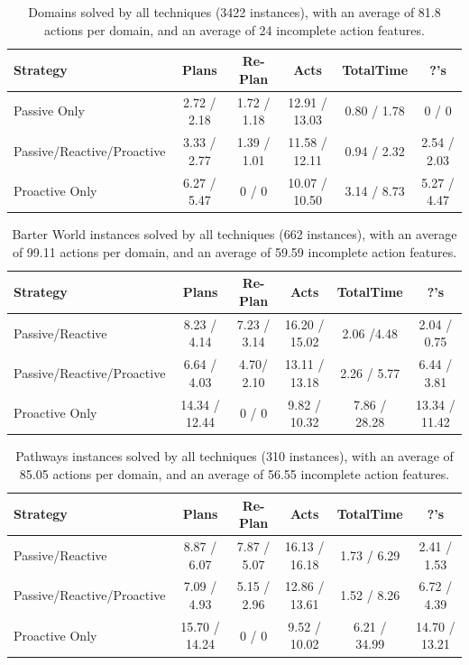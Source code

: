 \documentclass[letterpaper]{article}
\begin{document}
\begin{table}\centering\begin{tabular}{|l|ccccc|}																					\hline
Strategy	&	Plans			&	Re-Plan			&	Acts			&	TotalTime			&	?'s			\\\hline
Passive Only	&	2.72	/	2.18	&	1.72	/	1.18	&	12.91	/	13.03	&	0.80	/	1.78	&	0	/	0	\\
Passive/Reactive/Proactive	&	3.33	/	2.77	&	1.39	/	1.01	&	11.58	/	12.11	&	0.94	/	2.32	&	2.54	/	2.03	\\
Proactive Only	&	6.27	/	5.47	&	0	/	0	&	10.07	/	10.50	&	3.14	/	8.73	&	5.27	/	4.47	\\\hline
\end{tabular}\caption{\label{tab:t2}Domains solved by all techniques (3422
instances), with an average of 81.8 actions per domain, and an average of 24 incomplete action features.}\end{table} \begin{table}\centering\begin{tabular}{|l|ccccc|}\hline																					
Strategy	&	Plans			&	Re-Plan			&	Acts			&	TotalTime			&	?'s			\\\hline
Passive/Reactive 	&	8.23	/	4.14	&	7.23	/	3.14	&	16.20	/	15.02	&	2.06	/4.48	&	2.04	/	0.75	\\ 
Passive/Reactive/Proactive	&	6.64	/	4.03	&	4.70/	2.10	&	13.11	/	13.18	&	2.26	/	5.77	&	6.44	/	3.81	\\ 
Proactive Only	&	14.34	/	12.44	&	0	/	0	&	9.82	/	10.32	&	7.86	/	28.28	&	13.34	/	11.42	\\\hline
\end{tabular}\caption{\label{tab:t3}Barter World instances solved by all
techniques (662 instances), with an average of 99.11 actions per domain, and an average of 59.59 incomplete action features.}\end{table} \begin{table}\centering\begin{tabular}{|l|ccccc|}\hline																					
Strategy	&	Plans			&	Re-Plan			&	Acts			&	TotalTime			&	?'s			\\\hline
Passive/Reactive	&	8.87	/	6.07	&	7.87	/	5.07	&	16.13	/	16.18	&	1.73	/	6.29	&	2.41	/	1.53	\\
Passive/Reactive/Proactive	&	7.09	/	4.93	&	5.15
/	2.96	&	12.86	/	13.61	&	1.52	/	8.26	&	6.72	/	4.39	\\ 
Proactive Only	&	15.70	/	14.24	&	0	/	0	&	9.52	/	10.02	&	6.21	/	34.99	&	14.70	/	13.21	\\\hline
\end{tabular}\caption{\label{tab:t4}Pathways instances solved by all techniques
(310 instances), with an average of 85.05 actions per domain, and an average of 56.55 incomplete action features.}\end{table}																					%
\end{document}
